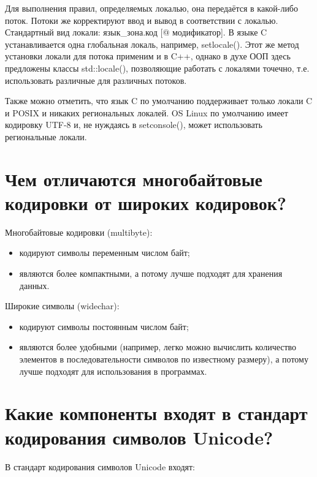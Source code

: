 \documentclass[a4paper,12pt]{article}	%
\begin{document}
	Для выполнения правил, определяемых локалью, она передаётся в какой-либо поток. Потоки же корректируют ввод и вывод в соответствии с локалью. Стандартный вид локали: язык\_зона.код [@ модификатор]. В языке C устанавливается одна глобальная локаль, например, setlocale(). Этот же метод установки локали для потока применим и в C++, однако в духе ООП здесь предложены классы std::locale(), позволяющие работать с локалями точечно, т.е. использовать различные для различных потоков.
	
	Также можно отметить, что язык C по умолчанию поддерживает только локали C и POSIX и никаких региональных локалей. OS Linux по умолчанию имеет кодировку UTF-8 и, не нуждаясь в setconsole(), может использовать региональные локали.
	
\section{Чем отличаются многобайтовые кодировки от широких кодировок?}

	Многобайтовые кодировки (multibyte):	
	\begin{itemize}
	
		\item кодируют символы переменным числом байт;
		
		\item являются более компактными, а потому лучше подходят для хранения данных.
	
	\end{itemize}
	
	Широкие символы (widechar):
	\begin{itemize}
	
		\item кодируют символы постоянным числом байт;
		
		\item являются более удобными (например, легко можно вычислить количество элементов в последовательности символов по известному размеру), а потому лучше подходят для использования в программах.
	
	\end{itemize}

\section{Какие компоненты входят в стандарт кодирования символов Unicode?}

	В стандарт кодирования символов Unicode входят:
	
\end{document}
